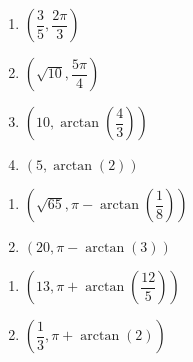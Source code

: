 \begin{multicols}{4}

\begin{enumerate}

\setcounter{enumi}{\value{HW}}

\item $\left( \dfrac{3}{5}, \dfrac{2\pi}{3} \right)$
\item $\left( \sqrt{10}, \dfrac{5\pi}{4} \right)$
\item  $\left( 10, \arctan\left(\dfrac{4}{3}\right) \right)$
\item  $\left( 5, \arctan\left(2\right) \right)$ 

\setcounter{HW}{\value{enumi}}

\end{enumerate}

\end{multicols}

\begin{multicols}{2}

\begin{enumerate}

\setcounter{enumi}{\value{HW}}

\item $\left( \sqrt{65}, \pi - \arctan\left(\dfrac{1}{8}\right)\right)$
\item  $(20, \pi - \arctan(3))$ 

\setcounter{HW}{\value{enumi}}

\end{enumerate}

\end{multicols}

\begin{multicols}{2}

\begin{enumerate}

\setcounter{enumi}{\value{HW}}

\item  $\left(13, \pi + \arctan\left(\dfrac{12}{5}\right) \right)$
\item  $\left(\dfrac{1}{3}, \pi + \arctan\left(2\right) \right)$ 

\setcounter{HW}{\value{enumi}}

\end{enumerate}

\end{multicols}

